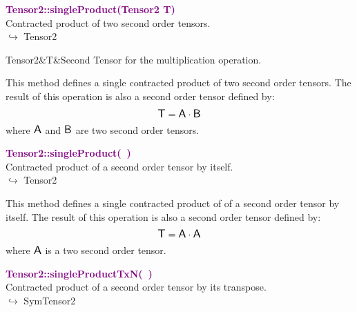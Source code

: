 \textcolor{purple}{\textbf{Tensor2::singleProduct(Tensor2 T)}}\label{Tensor2::singleProduct(Tensor2 T)}\\
Contracted product of two second order tensors.\\ \hspace*{10mm}$\hookrightarrow$ Tensor2

\begin{tcolorbox}[width=\textwidth,myArgs,tabularx={ll|R}]
Tensor2&T&Second Tensor for the multiplication operation.
\end{tcolorbox}

This method defines a single contracted product of two second order tensors.
The result of this operation is also a second order tensor defined by:
\begin{equation*}
\mbox{\large\ensuremath{\mathsf{T}}} = \mbox{\large\ensuremath{\mathsf{A}}} \cdot \mbox{\large\ensuremath{\mathsf{B}}}
\end{equation*}
where $\mbox{\large\ensuremath{\mathsf{A}}}$ and $\mbox{\large\ensuremath{\mathsf{B}}}$ are two second order tensors.

\textcolor{purple}{\textbf{Tensor2::singleProduct(~)}}\label{Tensor2::singleProduct()}\\
Contracted product of a second order tensor by itself.\\ \hspace*{10mm}$\hookrightarrow$ Tensor2

This method defines a single contracted product of of a second order tensor by itself.
The result of this operation is also a second order tensor defined by:
\begin{equation*}
\mbox{\large\ensuremath{\mathsf{T}}} = \mbox{\large\ensuremath{\mathsf{A}}} \cdot \mbox{\large\ensuremath{\mathsf{A}}}
\end{equation*}
where $\mbox{\large\ensuremath{\mathsf{A}}}$ is a two second order tensor.

\textcolor{purple}{\textbf{Tensor2::singleProductTxN(~)}}\label{Tensor2::singleProductTxN()}\\
Contracted product of a second order tensor by its transpose.\\ \hspace*{10mm}$\hookrightarrow$ SymTensor2

